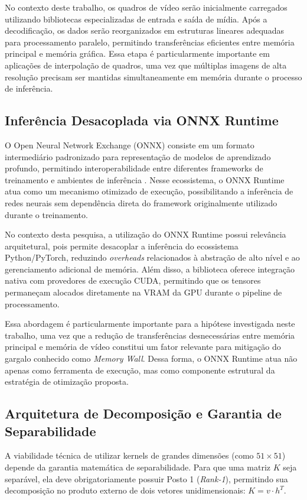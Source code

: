 \documentclass[
    12pt,                %
    openright,           %
    oneside,             %
    a4paper,             %
    english,             %
    brazil               %
]{abntex2}
\begin{document}
No contexto deste trabalho, os quadros de vídeo serão inicialmente carregados utilizando bibliotecas especializadas de entrada e saída de mídia. Após a decodificação, os dados serão reorganizados em estruturas lineares adequadas para processamento paralelo, permitindo transferências eficientes entre memória principal e memória gráfica. Essa etapa é particularmente importante em aplicações de interpolação de quadros, uma vez que múltiplas imagens de alta resolução precisam ser mantidas simultaneamente em memória durante o processo de inferência.


\subsection{Inferência Desacoplada via ONNX Runtime}

O Open Neural Network Exchange (ONNX) consiste em um formato intermediário padronizado para representação de modelos de aprendizado profundo, permitindo interoperabilidade entre diferentes frameworks de treinamento e ambientes de inferência \cite{ONNX2026}. Nesse ecossistema, o ONNX Runtime atua como um mecanismo otimizado de execução, possibilitando a inferência de redes neurais sem dependência direta do framework originalmente utilizado durante o treinamento.

No contexto desta pesquisa, a utilização do ONNX Runtime possui relevância arquitetural, pois permite desacoplar a inferência do ecossistema Python/PyTorch, reduzindo \textit{overheads} relacionados à abstração de alto nível e ao gerenciamento adicional de memória. Além disso, a biblioteca oferece integração nativa com provedores de execução CUDA, permitindo que os tensores permaneçam alocados diretamente na VRAM da GPU durante o pipeline de processamento.

Essa abordagem é particularmente importante para a hipótese investigada neste trabalho, uma vez que a redução de transferências desnecessárias entre memória principal e memória de vídeo constitui um fator relevante para mitigação do gargalo conhecido como \textit{Memory Wall}. Dessa forma, o ONNX Runtime atua não apenas como ferramenta de execução, mas como componente estrutural da estratégia de otimização proposta.


\subsection{Arquitetura de Decomposição e Garantia de Separabilidade}

A viabilidade técnica de utilizar kernels de grandes dimensões (como $51 \times 51$) depende da garantia matemática de separabilidade. Para que uma matriz $K$ seja separável, ela deve obrigatoriamente possuir Posto 1 (\textit{Rank-1}), permitindo sua decomposição no produto externo de dois vetores unidimensionais: $K = v \cdot h^T$.
\end{document}
